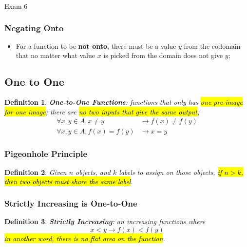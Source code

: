 \documentclass{note}
\newtheorem{definition}{Definition}
\begin{document}
\begin{note}{Exam 6}
        \subsubsection{Negating Onto}
        \begin{itemize}
            \item For a function to be \textbf{not onto}, there must be a value $ y $ from the codomain that no matter what value $ x $
            is picked from the domain does not give $ y $;
        \end{itemize}

        \subsection{One to One}

        \begin{definition}
            \textbf{One-to-One Functions}: functions that only has \hl{one pre-image for one image}; there are \hl{no two inputs that give
            the same output};
            \begin{align}
                \forall x, y \in A, x \neq y &\to f(x) \neq f(y)\\
                \forall x, y \in A, f(x) = f(y) &\to x = y
            \end{align}
        \end{definition}

        \subsubsection{Pigeonhole Principle}

        \begin{definition}
            Given $ n $ objects, and $ k $ labels to assign on those objects, \hl{if $ n > k $, then two objects must share the same label}.
        \end{definition}

        \subsubsection{Strictly Increasing is One-to-One}

        \begin{definition}
            \textbf{Strictly Increasing}: an increasing functions where
            \begin{equation}\label{eq: strictly increasing}
                x < y \to f(x) < f(y)
            \end{equation}
            \hl{in another word, there is no flat area on the function}.
        \end{definition}


\end{note}
\end{document}
